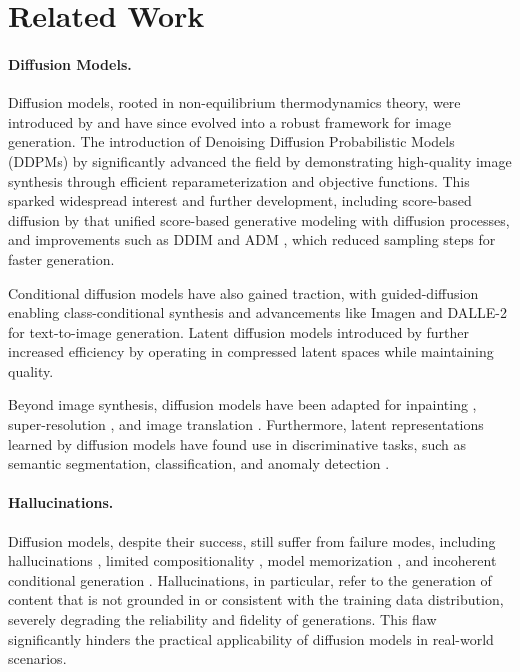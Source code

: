 \section{Related Work}

\paragraph{Diffusion Models.}
Diffusion models, rooted in non-equilibrium thermodynamics theory, were introduced by \citet{sohl2015deep} and have since evolved into a robust framework for image generation.
The introduction of Denoising Diffusion Probabilistic Models (DDPMs) by \citet{ho2020ddpm} significantly advanced the field by demonstrating high-quality image synthesis through efficient reparameterization and objective functions. This sparked widespread interest and further development, including score-based diffusion by \citet{song2020score} that unified score-based generative modeling with diffusion processes, and improvements such as DDIM \citep{song2020ddim} and ADM \citep{nichol2021improved}, which reduced sampling steps for faster generation.

Conditional diffusion models have also gained traction, with guided-diffusion \citep{dhariwal2021guideddiffusion} enabling class-conditional synthesis and advancements like Imagen \citep{saharia2022imagen} and DALLE-2 \citep{ramesh2022dalle2} for text-to-image generation. 
Latent diffusion models introduced by \citet{rombach2022sd} further increased efficiency by operating in compressed latent spaces while maintaining quality.

Beyond image synthesis, diffusion models have been adapted for inpainting \citep{lugmayr2022repaint, corneanu2024latentpaint}, super-resolution \citep{saharia2022image, gao2023implicit}, and image translation \citep{saharia2022palette, wolleb2022swiss}. 
Furthermore, latent representations learned by diffusion models have found use in discriminative tasks, such as semantic segmentation, classification, and anomaly detection \citep{mukhopadhyay2023text, graikos2022diffusion, zimmermann2021score, wyatt2022anoddpm, pinaya2022fast}.

\vspace{-10pt}
\paragraph{Hallucinations.}  Diffusion models, despite their success, still suffer from failure modes, including hallucinations \citep{borji2023qualitative,narasimhaswamy2024handiffuser}, limited compositionality \citep{conwell2023comprehensive,gokhale2022benchmarking}, model memorization \citep{carlini2023extracting,somepalli2023diffusion}, and incoherent conditional generation \citep{liu2023discovering}. 
Hallucinations, in particular, refer to the generation of content that is not grounded in or consistent with the training data distribution, severely degrading the reliability and fidelity of generations. 
This flaw significantly hinders the practical applicability of diffusion models in real-world scenarios. 

